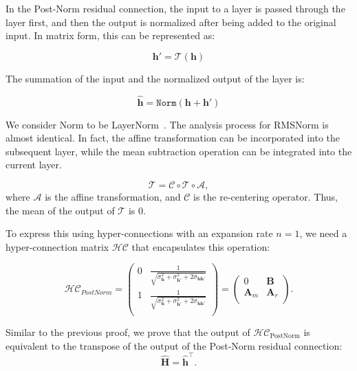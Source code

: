 In the Post-Norm residual connection, the input to a layer is passed through the layer first, and then the output is normalized after being added to the original input. In matrix form, this can be represented as:

\begin{equation}
\mathbf{h}' = \mathcal{T}(\mathbf{h})
\end{equation}

The summation of the input and the normalized output of the layer is:

\begin{equation}
\mathbf{\hat{h}} = \texttt{Norm}(\mathbf{h} + \mathbf{h}')
\end{equation}


We consider Norm to be LayerNorm~\citep{zhang2019root}. The analysis process for RMSNorm is almost identical. In fact, the affine transformation can be incorporated into the subsequent layer, while the mean subtraction operation can be integrated into the current layer.

\begin{equation}
\mathcal{T} = \mathcal{C} \circ \mathcal{T} \circ \mathcal{A},
\end{equation}
where $\mathcal{A}$ is the affine transformation, and $\mathcal{C}$ is the re-centering operator. Thus, the mean of the output of $\mathcal{T}$ is $0$.

To express this using hyper-connections with an expansion rate $n=1$, we need a hyper-connection matrix $\mathcal{HC}$ that encapsulates this operation:

\begin{equation}
\mathcal{HC}_{PostNorm}=\begin{pmatrix}
0 & \frac{1}{\sqrt{\sigma_{\mathbf{h}}^2 + \sigma_{\mathbf{h}'}^2 + 2\sigma_{\mathbf{h}\mathbf{h}'}}} \\
1 & \frac{1}{\sqrt{\sigma_{\mathbf{h}}^2 + \sigma_{\mathbf{h}'}^2 + 2\sigma_{\mathbf{h}\mathbf{h}'}}} \\
\end{pmatrix}=\begin{pmatrix}
0 & \mathbf{B} \\
\mathbf{A}_m & \mathbf{A}_r \\
\end{pmatrix}.
\end{equation}

Similar to the previous proof, we prove that the output of $\mathcal{HC}_{\text{PostNorm}}$ is equivalent to the transpose of the output of the Post-Norm residual connection: 
\begin{equation}
    \mathbf{\hat{H}}=\mathbf{\hat{h}}^\intercal.
\end{equation}

